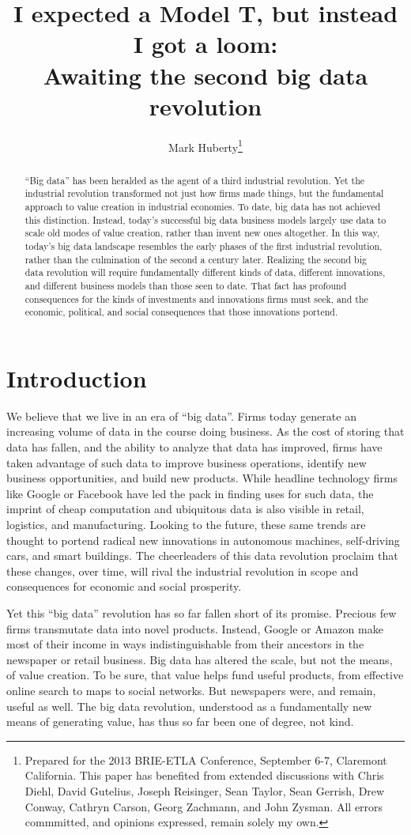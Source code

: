 \documentclass[12pt]{article}
\title{I expected a Model T, but instead I got a loom:\\ Awaiting the second big data revolution}
\author{Mark Huberty\thanks{Prepared for the 2013 BRIE-ETLA
    Conference, September 6-7, Claremont California. This paper has
    benefited from extended discussions with Chris Diehl, David
    Gutelius, Joseph Reisinger, Sean Taylor, Sean Gerrish, Drew
    Conway, Cathryn Carson, Georg Zachmann, and John
    Zysman. All errors commmitted, and opinions expressed, remain
    solely my own.}}
\begin{document}
\maketitle
\begin{abstract}
``Big data'' has been heralded as the agent of a third industrial
revolution. Yet the industrial revolution transformed not just how
firms made things, but the fundamental approach to value creation in
industrial economies. To date, big data has not achieved this
distinction. Instead, today's successful big data business models
largely use data to scale old modes of value creation, rather than
invent new ones altogether. In this way, today's big data landscape
resembles the early phases of the first industrial revolution, rather
than the culmination of the second a century later. Realizing the
second big data revolution will require fundamentally different kinds
of data, different innovations, and different business models than
those seen to date. That fact has profound consequences for the kinds
of investments and innovations firms must seek, and the economic,
political, and social consequences that those innovations portend.
\end{abstract}


\section{Introduction}
\label{sec:introduction}

We believe that we live in an era of ``big data''. Firms today
generate an increasing volume of data in the course doing business. As
the cost of storing that data has fallen, and the ability to analyze
that data has improved, firms have taken advantage of such data to
improve business operations, identify new business opportunities, and
build new products. While headline technology firms like Google or
Facebook have led the pack in finding uses for such data, the imprint
of cheap computation and ubiquitous data is also visible in retail,
logistics, and manufacturing. Looking to the future, these same trends
are thought to portend radical new innovations in autonomous machines,
self-driving cars, and smart buildings. The cheerleaders of this data revolution
proclaim that these changes, over time, will rival the industrial
revolution in scope and consequences for economic and social
prosperity. 

Yet this ``big data'' revolution has so far fallen short of its
promise. Precious few firms transmutate data into novel
products. Instead, Google or Amazon make most of their income in ways
indistinguishable from their ancestors in the newspaper or retail
business. Big data has altered the scale, but not the means, of value
creation. To be sure, that value helps fund useful products, from
effective online search to maps to social networks. But newspapers
were, and remain, useful as well. The big data revolution, understood
as a fundamentally new means of generating value, has thus so far been
one of degree, not kind.
\end{document}
